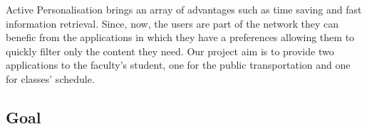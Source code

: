\documentclass[]{usiinfbachelorproject}
\begin{document}
Active Personalisation brings an array of advantages such as time saving and fast information retrieval. Since, now, the users are part of the network they can benefic from the applications in which they have a preferences allowing them to quickly filter only the content they need. Our project aim is to provide two applications to the faculty's student, one for the public transportation and one for classes' schedule. 
\begin{figure}[H]
  \centering
  \hfill
  \caption{}
\end{figure} 

%
\subsection{Goal}
\end{document}

